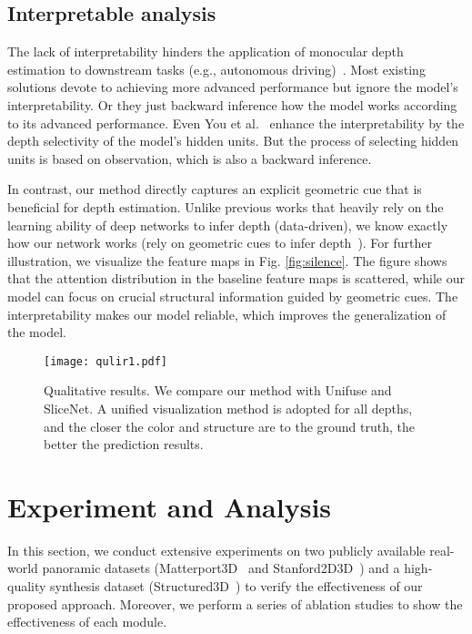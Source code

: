 \documentclass[10pt,times,mathptm,psfig,twocolumn,journals]{IEEEtran}
\begin{document}
\subsection{Interpretable analysis}
\label{Interpretable}
The lack of interpretability hinders the application of monocular depth estimation to downstream tasks (e.g., autonomous driving)~\cite{you2021towards}. Most existing solutions devote to achieving more advanced performance but ignore the model’s interpretability. Or they just backward inference how the model works according to its advanced performance. Even You et al.~\cite{you2021towards} enhance the interpretability by the depth selectivity of the model's hidden units. But the process of selecting hidden units is based on observation, which is also a backward inference.

In contrast, our method directly captures an explicit geometric cue that is beneficial for depth estimation. Unlike previous works that heavily rely on the learning ability of deep networks to infer depth (data-driven), we know exactly how our network works (rely on geometric cues to infer depth~\cite{dijk2019neural}). For further illustration, we visualize the feature maps in Fig. \ref{fig:silence}. The figure shows that the attention distribution in the baseline feature maps is scattered, while our model can focus on crucial structural information guided by geometric cues. The interpretability makes our model reliable, which improves the generalization of the model.
\begin{figure*}[t]
\centering
\texttt{[image: qulir1.pdf]}
\caption{Qualitative results. We compare our method with Unifuse\cite{Jiang_2021} and SliceNet\cite{Pintore_2021_CVPR}. A unified visualization method is adopted for all depths, and the closer the color and structure are to the ground truth, the better the prediction results.}
\label{fig:cc1}
\end{figure*}
\section{Experiment and Analysis}
\label{experiment}
In this section, we conduct extensive experiments on two publicly available real-world panoramic datasets (Matterport3D~\cite{Chang2018Matterport3D} and Stanford2D3D~\cite{DBLP:journals/corr/ArmeniSZS17}) and a high-quality synthesis dataset (Structured3D~\cite{zheng2020structured3d}) to verify the effectiveness of our proposed approach. Moreover, we perform a series of ablation studies to show the effectiveness of each module.  
 
\end{document}
